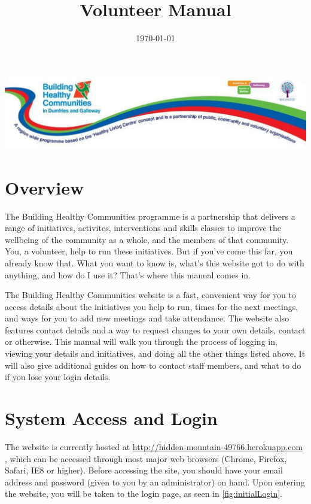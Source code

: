 \documentclass{bhcguides}
\begin{document}
\title{Volunteer Manual}
\includegraphics[width=1.0\textwidth]{BHCbanner.png}
\date{\today}
\maketitle

\tableofcontents

\section{Overview}

The Building Healthy Communities programme is a partnership that delivers a range of initiatives, activites, interventions and skills classes to improve the wellbeing of the community as a whole, and the members of that community. You, a volunteer, help to run these initiatives. But if you've come this far, you already know that. What you want to know is, what's this website got to do with anything, and how do I use it? That's where this manual comes in.

The Building Healthy Communities website is a fast, convenient way for you to access details about the initiatives you help to run, times for the next meetings, and ways for you to add new meetings and take attendance. The website also features contact details and a way to request changes to your own details, contact or otherwise. This manual will walk you through the process of logging in, viewing your details and initiatives, and doing all the other things listed above. It will also give additional guides on how to contact staff members, and what to do if you lose your login details.

\pagebreak

\section{System Access and Login}
\label{sec:syslogin}

The website is currently hosted at \url{http://hidden-mountain-49766.herokuapp.com} , which can be accessed through most major web browsers (Chrome, Firefox, Safari, IE8 or higher). Before accessing the site, you should have your email address and password (given to you by an administrator) on hand. Upon entering the website, you will be taken to the login page, as seen in \autoref{fig:initialLogin}.
\end{document}
